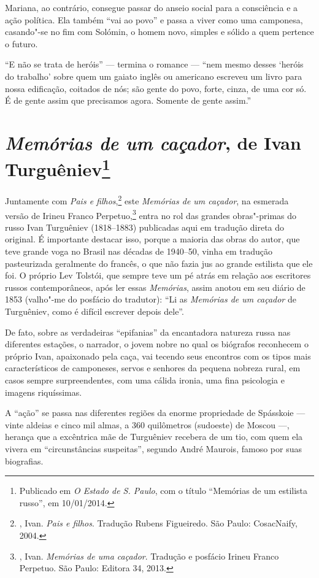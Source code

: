 Mariana, ao contrário, consegue passar do anseio social para a consciência e a ação política. Ela também ``vai ao povo'' e passa a
viver como uma camponesa, casando"-se no fim com Solómin, o homem novo, simples e sólido a quem pertence o futuro.

``E não se trata de heróis'' --- termina o romance --- ``nem mesmo desses `heróis do trabalho' sobre quem um gaiato inglês ou americano escreveu um livro para nossa edificação, coitados de nós; são gente do povo, forte, cinza, de uma cor só. É de gente assim que precisamos agora. Somente de gente assim.''

\chapter{\emph{Memórias de um caçador}, de Ivan Turguêniev\footnote{Publicado em \emph{O Estado de S. Paulo}, com o título ``Memórias de um estilista russo'', em 10/01/2014.}}

Juntamente com \emph{Pais e filhos},\footnote{, Ivan. \emph{Pais e filhos}. Tradução Rubens Figueiredo. São Paulo: CosacNaify, 2004.} este \emph{Memórias de um caçador}, na esmerada
versão de Irineu Franco Perpetuo,\footnote{, Ivan. \emph{Memórias de uma caçador}. Tradução e posfácio Irineu Franco Perpetuo. São Paulo: Editora 34, 2013.} entra no rol das grandes
obras"-primas do russo Ivan Turguêniev (1818--1883) publicadas aqui em tradução direta do original. É importante destacar isso, porque a
maioria das obras do autor, que teve grande voga no Brasil nas décadas de 1940--50, vinha em tradução pasteurizada geralmente do francês, o que não fazia jus ao grande estilista que ele foi. O próprio Lev Tolstói,
que sempre teve um pé atrás em relação aos escritores russos contemporâneos, após ler essas \emph{Memórias}, assim anotou em seu
diário de 1853 (valho"-me do posfácio do tradutor): ``Li as \emph{Memórias de um caçador} de Turguêniev, como é difícil escrever depois dele''.

De fato, sobre as verdadeiras ``epifanias'' da encantadora natureza russa nas diferentes estações, o narrador, o jovem nobre no qual os biógrafos reconhecem o próprio Ivan, apaixonado pela caça, vai tecendo seus encontros com os tipos mais característicos de camponeses, servos e senhores da pequena nobreza rural, em casos sempre surpreendentes, com uma cálida ironia, uma fina psicologia e imagens riquíssimas.

A ``ação'' se passa nas diferentes regiões da enorme propriedade de Spásskoie --- vinte aldeias e cinco mil almas, a 360 quilômetros (sudoeste) de Moscou ---, herança que a excêntrica mãe de Turguêniev recebera de um tio, com quem ela vivera em ``circunstâncias suspeitas'', segundo André Maurois, famoso por suas biografias.

